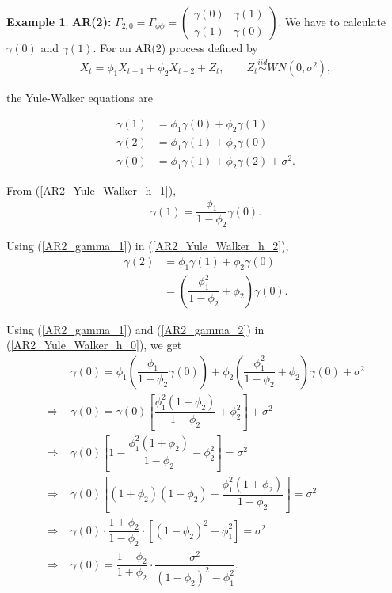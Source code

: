 \documentclass[11pt, a4paper]{article}
\numberwithin{equation}{section}
\theoremstyle{definition}
\newtheorem{example}{Example}[subsection]
\begin{document}
\begin{example}
\textbf{AR(2):} $\Gamma_{2, 0} = \Gamma_{\phi \phi} = \begin{pmatrix} \gamma(0) & \gamma(1) \\ \gamma(1) & \gamma(0) \end{pmatrix}.$ We have to calculate $\gamma(0)$ and $\gamma(1)$. For an AR(2) process defined by
\begin{align}\label{ar2_phi_representation}
X_t = \phi_1 X_{t-1} + \phi_2 X_{t-2} + Z_t, \qquad Z_t \overset{iid}{\sim} WN(0,\sigma^2),
\end{align}

the Yule-Walker equations are

\begin{align}
\gamma(1) &= \phi_1 \gamma(0) + \phi_2 \gamma(1) \label{AR2_Yule_Walker_h_1} \\[0.3em]
\gamma(2) &= \phi_1 \gamma(1) + \phi_2 \gamma(0) \label{AR2_Yule_Walker_h_2} \\[0.3em]
\gamma(0) &= \phi_1 \gamma(1) + \phi_2 \gamma(2) + \sigma^2. \label{AR2_Yule_Walker_h_0}
\end{align}

From (\ref{AR2_Yule_Walker_h_1}),
\begin{equation} \label{AR2_gamma_1}
\gamma(1) = \dfrac{\phi_1}{1-\phi_2}\gamma(0).
\end{equation}

Using (\ref{AR2_gamma_1}) in (\ref{AR2_Yule_Walker_h_2}),
\begin{align}
\gamma(2) &= \phi_1\gamma(1) + \phi_2\gamma(0) \nonumber \\[0.3em]
&= \left( \dfrac{\phi_1^2}{1-\phi_2} + \phi_2 \right) \gamma(0). \label{AR2_gamma_2}
\end{align}

Using (\ref{AR2_gamma_1}) and (\ref{AR2_gamma_2}) in (\ref{AR2_Yule_Walker_h_0}), we get
\begin{align}
\,\, &\gamma(0) 
= \phi_1\left(\dfrac{\phi_1}{1-\phi_2}\gamma(0)\right) + \phi_2 \left( \dfrac{\phi_1^2}{1-\phi_2} + \phi_2 \right) \gamma(0) + \sigma^2 \nonumber \\[0.5em]
\Rightarrow \,\, &\gamma(0) = \gamma(0) \left[ \dfrac{\phi_1^2(1+\phi_2)}{1-\phi_2} + \phi_2^2 \right] + \sigma^2 \nonumber \\[0.5em]
\Rightarrow \,\, &\gamma(0) \left[ 1 - \dfrac{\phi_1^2(1+\phi_2)}{1-\phi_2} - \phi_2^2 \right] = \sigma^2 \nonumber \\[0.5em]
\Rightarrow \,\, &\gamma(0) \left[ \left( 1 + \phi_2 \right) \left( 1 - \phi_2 \right) - \dfrac{\phi_1^2(1+\phi_2)}{1-\phi_2} \right] = \sigma^2 \nonumber \\[0.5em]
\Rightarrow \,\, &\gamma(0) \cdot \dfrac{1 + \phi_2}{1 - \phi_2} \cdot \left[ \left( 1 - \phi_2 \right)^2 - \phi_1^2 \right] = \sigma^2 \nonumber \\[0.5em]
\Rightarrow \,\, &\gamma(0) = \dfrac{1 - \phi_2}{1 + \phi_2} \cdot \dfrac{\sigma^2}{\left( 1 - \phi_2 \right)^2 - \phi_1^2}. \label{AR2_gamma_0_final}
\end{align}


\end{example}
\end{document}
